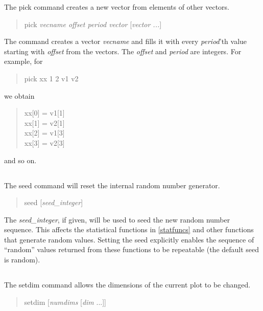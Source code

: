 
The {\cb pick} command creates a new vector from elements of other vectors.
\begin{quote}\vt
pick {\it vecname offset period vector} [{\it vector ...\/}]
\end{quote}
The command creates a vector {\it vecname} and fills it with every
{\it period\/}'th value starting with {\it offset} from the vectors. 
The {\it offset} and {\it period} are integers.  For example, for
\begin{quote}\vt
    pick xx 1 2 v1 v2
\end{quote}
we obtain
\begin{quote}\vt
  xx[0] = v1[1]\\
  xx[1] = v2[1]\\
  xx[2] = v1[3]\\
  xx[3] = v2[3]\\
\end{quote}
and so on.

\subsection{}


The {\cb seed} command will reset the internal random number generator.
\begin{quote}\vt
seed [{\it seed\_integer\/}]
\end{quote}
The {\it seed\_integer\/}, if given, will be used to seed the new
random number sequence.  This affects the statistical functions in
\ref{statfuncs} and other functions that generate random values. 
Setting the seed explicitly enables the sequence of ``random'' values
returned from these functions to be repeatable (the default seed is
random).

\subsection{}


The {\cb setdim} command allows the dimensions of the current plot to
be changed.

\begin{quote}
{\vt setdim} [{\it numdims} [{\it dim} ...]]
\end{quote}
  
